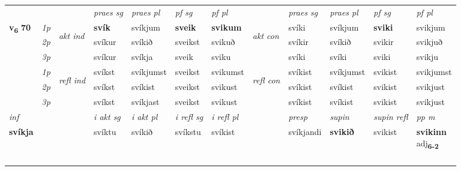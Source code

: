 \begin{longtable}[l]{X>{\footnotesize\itshape}llXXXXlXXXX}
\midrule

 & &   & \textit{praes sg}  & \textit{praes pl}    & \textit{ pf sg} & \textit{pf pl} & & \textit{praes sg}  & \textit{praes pl}    & \textit{pf sg} & \textit{pf pl }  \\ \cmidrule{4-7} \cmidrule{9-12}
 \multirow{2}{*}{{{\textbf{v{\textsubscript{6}}} \Large{\textbf{70}}}}}  & 1p & \multirow{3}{*}{\begin{turn}{90}\textit{akt ind}\end{turn}} & \textbf{svík} & svíkjum & \textbf{sveik} & \textbf{svikum} & \multirow{3}{*}{\begin{turn}{90}\textit{akt con}\end{turn}} &svíki & svíkjum & \textbf{sviki} & svikjum\\*
 & 2p &  &  svíkur  & svíkið & sveikst & svikuð & & svíkir & svíkið & svikir & svikjuð \\*
 & 3p &  & svíkur & svíkja & sveik & sviku & & svíki & svíki& sviki & svikju \\*
\cmidrule{4-7} \cmidrule{9-12}
 & 1p & \multirow{3}{*}{\begin{turn}{90}\textit{refl ind}\end{turn}}  & svíkst & svíkjumst & sveikst & svikumst & \multirow{3}{*}{\begin{turn}{90}\textit{refl con}\end{turn}}  &svíkist & svíkjumst & svikist & svikjumst \\*
 & 2p &  & svíkst & svíkist & sveikst & svikust & &svíkist & svíkist & svikist & svikjust \\*
 & 3p  & & svíkst & svíkjast & sveikst & svikust & & svíkist & svíkist& svikist & svikjust \\*
\cmidrule{4-7} \cmidrule{9-12}

   {\textit{inf}} & &  & \textit{i akt sg} & \textit{i akt pl} & \textit{i refl sg} & \textit{i refl pl} && \textit{presp} & \textit{supin} & \textit{supin refl} & \textit{pp m} \\*
  {\textbf{svíkja}} & && svíktu  & svíkið & svíkstu & svíkist && svíkjandi &  \textbf{svikið} & svikist & \specialcell{\textbf{svikinn} \\ adj\textbf{\textsubscript{6-2}}} \\*

\midrule
& \\*
 & \\*
   & \\*
  & \\
  

\end{longtable}

